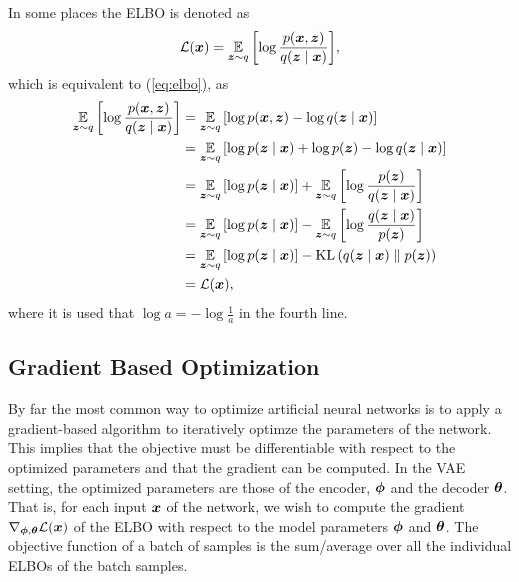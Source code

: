 In some places the ELBO is denoted as
\[ \mathcal{L}(\bm{ x }) = \operatorname*{\mathbb{E}}_{\bm{ z }\sim q}{\mathopen{} \left[ \log \frac{p(\bm{ x }, \bm{ z })}{q(\bm{ z } \mid \bm{ x })} \right] \mathclose{}},\]
which is equivalent to (\ref{eq:elbo}), as
\begin{align*}
    \operatorname*{\mathbb{E}}_{\bm{ z }\sim q}{\mathopen{} \left[ \log \frac{p(\bm{ x }, \bm{ z })}{q(\bm{ z } \mid \bm{ x })} \right] \mathclose{}} &= \operatorname*{\mathbb{E}}_{\bm{ z }\sim q}{\mathopen{} \left[ \log p(\bm{ x }, \bm{ z }) - \log q(\bm{ z } \mid \bm{ x }) \right] \mathclose{}}\\
    &= \operatorname*{\mathbb{E}}_{\bm{ z }\sim q}{\mathopen{} \left[ \log p(\bm{ z } \mid \bm{ x }) + \log p(\bm{ z }) - \log q(\bm{ z } \mid \bm{ x }) \right] \mathclose{}}\\
    &= \operatorname*{\mathbb{E}}_{\bm{ z }\sim q}{\mathopen{} \left[ \log p(\bm{ z } \mid \bm{ x }) \right] \mathclose{}} + \operatorname*{\mathbb{E}}_{\bm{ z }\sim q}{\mathopen{} \left[ \log \frac{p(\bm{ z })}{q(\bm{ z } \mid \bm{ x })} \right] \mathclose{}}\\
    &= \operatorname*{\mathbb{E}}_{\bm{ z }\sim q}{\mathopen{} \left[ \log p(\bm{ z } \mid \bm{ x }) \right] \mathclose{}} - \operatorname*{\mathbb{E}}_{\bm{ z }\sim q}{\mathopen{} \left[ \log \frac{q(\bm{ z } \mid \bm{ x })}{p(\bm{ z })} \right] \mathclose{}}\\
    &= \operatorname*{\mathbb{E}}_{\bm{ z }\sim q}{\mathopen{} \left[ \log p(\bm{ z } \mid \bm{ x }) \right] \mathclose{}} - \operatorname{KL}{\mathopen{} \left(q(\bm{ z } \mid \bm{ x }) \parallel p(\bm{ z })\right) \mathclose{}}\\
    &= \mathcal{L}(\bm{ x }),
\end{align*}
where it is used that $\log a = - \log \frac{1}{a}$ in the fourth line.

\subsection{Gradient Based Optimization}
\label{seq:gradient_based)optimization}
By far the most common way to optimize artificial neural networks is to apply a gradient-based algorithm to iteratively optimze the parameters of the network. This implies that the objective must be differentiable with respect to the optimized parameters and that the gradient can be computed. In the VAE setting, the optimized parameters are those of the encoder, $\bm{ \phi }$ and the decoder $\bm{ \theta }$. That is, for each input $\bm{ x }$ of the network, we wish to compute the gradient $\nabla_{\bm{ \phi }, \bm{ \theta }} \mathcal{L}(\bm{ x })$ of the ELBO with respect to the model parameters $\bm{ \phi }$ and $\bm{ \theta }$. The objective function of a batch of samples is the sum/average over all the individual ELBOs of the batch samples.


